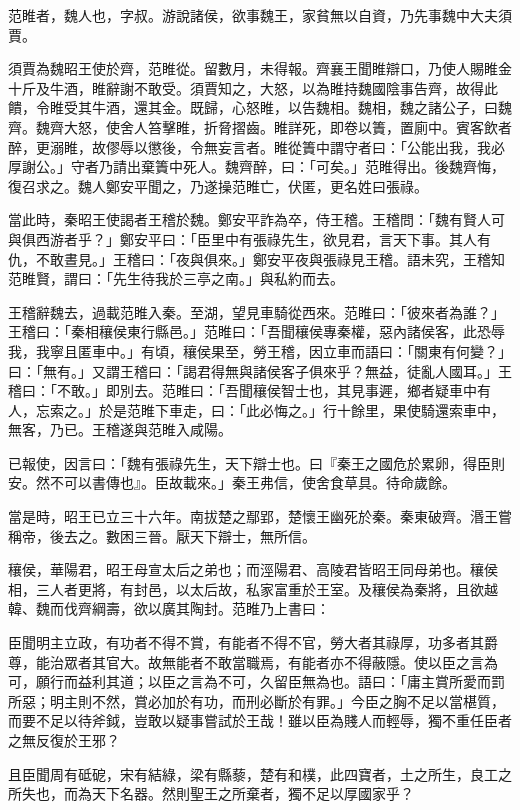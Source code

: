 
\begin{pinyinscope}
范睢者，魏人也，字叔。游說諸侯，欲事魏王，家貧無以自資，乃先事魏中大夫須賈。

須賈為魏昭王使於齊，范睢從。留數月，未得報。齊襄王聞睢辯口，乃使人賜睢金十斤及牛酒，睢辭謝不敢受。須賈知之，大怒，以為睢持魏國陰事告齊，故得此饋，令睢受其牛酒，還其金。既歸，心怒睢，以告魏相。魏相，魏之諸公子，曰魏齊。魏齊大怒，使舍人笞擊睢，折脅摺齒。睢詳死，即卷以簀，置廁中。賓客飲者醉，更溺睢，故僇辱以懲後，令無妄言者。睢從簀中謂守者曰：「公能出我，我必厚謝公。」守者乃請出棄簀中死人。魏齊醉，曰：「可矣。」范睢得出。後魏齊悔，復召求之。魏人鄭安平聞之，乃遂操范睢亡，伏匿，更名姓曰張祿。

當此時，秦昭王使謁者王稽於魏。鄭安平詐為卒，侍王稽。王稽問：「魏有賢人可與俱西游者乎？」鄭安平曰：「臣里中有張祿先生，欲見君，言天下事。其人有仇，不敢晝見。」王稽曰：「夜與俱來。」鄭安平夜與張祿見王稽。語未究，王稽知范睢賢，謂曰：「先生待我於三亭之南。」與私約而去。

王稽辭魏去，過載范睢入秦。至湖，望見車騎從西來。范睢曰：「彼來者為誰？」王稽曰：「秦相穰侯東行縣邑。」范睢曰：「吾聞穰侯專秦權，惡內諸侯客，此恐辱我，我寧且匿車中。」有頃，穰侯果至，勞王稽，因立車而語曰：「關東有何變？」曰：「無有。」又謂王稽曰：「謁君得無與諸侯客子俱來乎？無益，徒亂人國耳。」王稽曰：「不敢。」即別去。范睢曰：「吾聞穰侯智士也，其見事遲，鄉者疑車中有人，忘索之。」於是范睢下車走，曰：「此必悔之。」行十餘里，果使騎還索車中，無客，乃已。王稽遂與范睢入咸陽。

已報使，因言曰：「魏有張祿先生，天下辯士也。曰『秦王之國危於累卵，得臣則安。然不可以書傳也』。臣故載來。」秦王弗信，使舍食草具。待命歲餘。

當是時，昭王已立三十六年。南拔楚之鄢郢，楚懷王幽死於秦。秦東破齊。湣王嘗稱帝，後去之。數困三晉。厭天下辯士，無所信。

穰侯，華陽君，昭王母宣太后之弟也；而涇陽君、高陵君皆昭王同母弟也。穰侯相，三人者更將，有封邑，以太后故，私家富重於王室。及穰侯為秦將，且欲越韓、魏而伐齊綱壽，欲以廣其陶封。范睢乃上書曰：

臣聞明主立政，有功者不得不賞，有能者不得不官，勞大者其祿厚，功多者其爵尊，能治眾者其官大。故無能者不敢當職焉，有能者亦不得蔽隱。使以臣之言為可，願行而益利其道；以臣之言為不可，久留臣無為也。語曰：「庸主賞所愛而罰所惡；明主則不然，賞必加於有功，而刑必斷於有罪。」今臣之胸不足以當椹質，而要不足以待斧鉞，豈敢以疑事嘗試於王哉！雖以臣為賤人而輕辱，獨不重任臣者之無反復於王邪？

且臣聞周有砥砨，宋有結綠，梁有縣藜，楚有和樸，此四寶者，土之所生，良工之所失也，而為天下名器。然則聖王之所棄者，獨不足以厚國家乎？


\end{pinyinscope}

